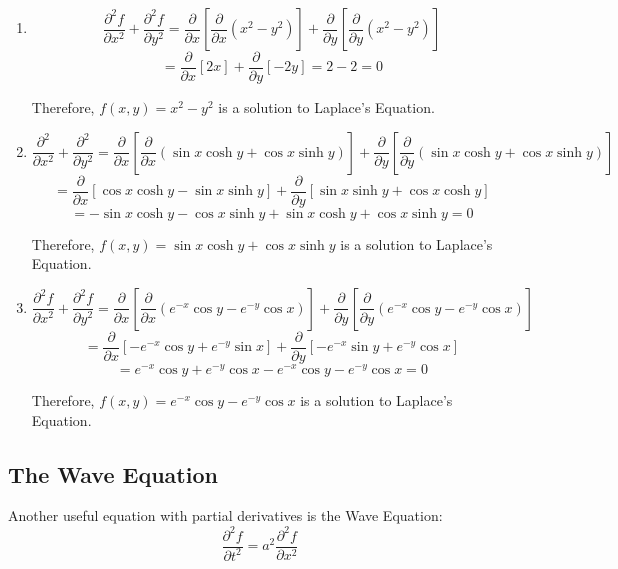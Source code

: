 \begin{Answer}[ref = laplace]
\begin{enumerate}
    \item $$\frac{\partial^2 f}{\partial x^2} + \frac{\partial^2 f}{\partial 
    y^2} = \frac{\partial}{\partial x} \left[ \frac{\partial}{\partial x} 
    \left( x^2 - y^2 \right) \right] + \frac{\partial}{\partial y} \left[ 
    \frac{\partial}{\partial y} \left( x^2 - y^2 \right) \right]$$
    $$= \frac{\partial}{\partial x} \left[ 2x \right] + \frac{\partial}{
    \partial y} \left[ -2y \right] = 2 - 2 = 0$$

    Therefore, $f(x, y) = x^2 - y^2$ is a solution to Laplace's Equation. 

    \item $$\frac{\partial^2}{\partial x^2} + \frac{\partial^2}{\partial y^2} 
    = \frac{\partial}{\partial x} \left[ \frac{\partial}{\partial x} \left( 
    \sin{x} \cosh{y} + \cos{x} \sinh{y} \right) \right] + \frac{\partial}{
    \partial y} \left[ \frac{\partial}{\partial y} \left( \sin{x} \cosh{y} + 
    \cos{x} \sinh{y} \right) \right]$$
    $$= \frac{\partial}{\partial x} \left[ \cos{x} \cosh{y} - \sin{x} \sinh{y} 
    \right] + \frac{\partial}{\partial y} \left[ \sin{x} \sinh{y} + \cos{x} 
    \cosh{y} \right]$$
    $$= -\sin{x}\cosh{y} - \cos{x}\sinh{y} + \sin{x}\cosh{y} + \cos{x} \sinh{
    y} = 0$$

    Therefore, $f(x, y) = \sin{x}\cosh{y} + \cos{x}\sinh{y}$ is a solution to 
    Laplace's Equation.

    \item $$\frac{\partial^2 f}{\partial x^2} + \frac{\partial^2 f}{\partial 
    y^2} = \frac{\partial}{\partial x} \left[ \frac{\partial}{\partial x} 
    \left( e^{-x}\cos{y} - e^{-y}\cos{x} \right) \right] + \frac{\partial}{
    \partial y} \left[ \frac{\partial}{\partial y} \left( e^{-x} \cos{y} - 
    e^{-y} \cos{x} \right) \right]$$
    $$= \frac{\partial}{\partial x} \left[ -e^{-x}\cos{y} + e^{-y}\sin{x} 
    \right] + \frac{\partial}{\partial y} \left[ -e^{-x}\sin{y} + e^{-y} 
    \cos{x} \right]$$
    $$= e^{-x} \cos{y} + e^{-y} \cos{x} - e^{-x} \cos{y} - e^{-y} \cos{x} = 0$$

    Therefore, $f(x, y) = e^{-x}\cos{y} - e^{-y}\cos{x}$ is a solution to Laplace's Equation.
\end{enumerate}
\end{Answer}

\subsection{The Wave Equation}
Another useful equation with partial derivatives is the Wave Equation:
$$\frac{\partial^2 f}{\partial t^2} = a^2 \frac{\partial^2 f}{\partial x^2}$$

